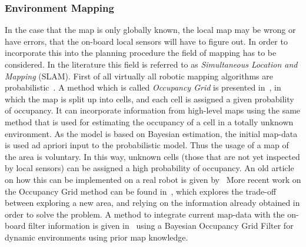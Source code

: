 \subsubsection{Environment Mapping}
In the case that the map is only globally known, the local map may be wrong or
have errors, that the on-board local sensors will have to figure out. In order
to incorporate this into the planning procedure the field of mapping has to be
considered. In the literature this field is referred to as \textit{Simultaneous
  Location and Mapping} (SLAM). First of all virtually all robotic mapping
algorithms are probabilistic~\cite{thrunRoboticMappingSurvey}. %
A method which is called \textit{Occupancy Grid} is presented
in~\cite{elfes1989using}, in which the map is split up into cells, and each cell
is assigned a given probability of occupancy. It can incorporate information
from high-level maps using the same method that is used for estimating the
occupancy of a cell in a totally unknown environment. As the model is based on
Bayesian estimation, the initial map-data is used ad apriori input to the
probabilistic model. Thus the usage of a map of the area is voluntary. In this
way, unknown cells (those that are not yet inspected by local sensors) can be
assigned a high probability of occupancy. An old article on how this can be
implemented on a real robot is given by~\cite[Krugman]{kriegman1987mobile} More
recent work on the Occupancy Grid method can be found
in~\cite{carrilloAutonomousRoboticExploration2015}, which explores the trade-off
between exploring a new area, and relying on the information already obtained in
order to solve the problem. A method to integrate current map-data with the
on-board filter information is given in~\cite{gindeleBayesianOccupancyGrid2009}
using a Bayesian Occupancy Grid Filter for dynamic environments using prior map
knowledge.
